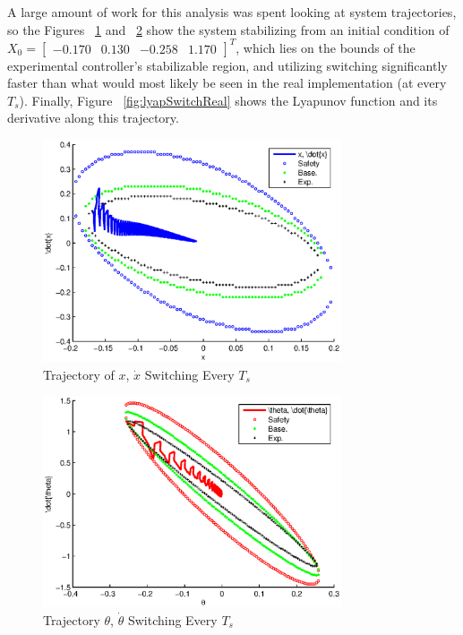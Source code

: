 \documentclass[conference]{IEEEtran}
\begin{document}
A large amount of work for this analysis was spent looking at system trajectories, so the Figures ~\ref{fig:trajSwitchX} and ~\ref{fig:trajSwitchTheta} show the system stabilizing from an initial condition of $X_{0}=\left[\begin{array}{cccc} -0.170 & 0.130 & -0.258 & 1.170 \end{array}\right]^T$, which lies on the bounds of the experimental controller's stabilizable region, and utilizing switching significantly faster than what would most likely be seen in the real implementation (at every $T_s$).  Finally, Figure ~\ref{fig:lyapSwitchReal} shows the Lyapunov function and its derivative along this trajectory.

\begin{figure}[htp]
\centering
\includegraphics[width=250pt]{trajSwitchX}
\caption{Trajectory of $x$, $\dot{x}$ Switching Every $T_s$}\label{fig:trajSwitchX}
\end{figure}

\begin{figure}[htp]
\centering
\includegraphics[width=250pt]{trajSwitchTheta}
\caption{Trajectory $\theta$, $\dot{\theta}$ Switching Every $T_s$}\label{fig:trajSwitchTheta}
\end{figure}
\end{document}
